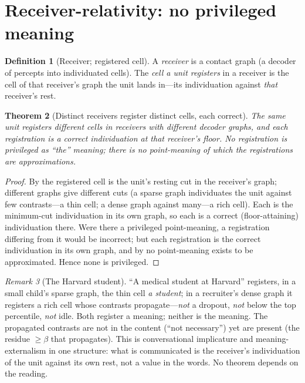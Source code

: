 \documentclass[twocolumn,11pt,a4paper]{article}
\theoremstyle{sup}
\newtheorem{theorem}{Theorem}[section]
\theoremstyle{definition}
\newtheorem{definition}[theorem]{Definition}
\theoremstyle{remark}
\newtheorem{remark}[theorem]{Remark}
\newcommand{\flo}{\beta}
\begin{document}
\section{Receiver-relativity: no privileged meaning}
\label{sec:receiver}

\begin{definition}[Receiver; registered cell]
\label{def:receiver}
A \emph{receiver} is a contact graph (a decoder of percepts into individuated
cells). The \emph{cell a unit registers} in a receiver is the cell of that
receiver's graph the unit lands in---its individuation against \emph{that}
receiver's rest.
\end{definition}

\begin{theorem}[Distinct receivers register distinct cells, each correct]
\label{thm:receiver}
The same unit registers different cells in receivers with different decoder
graphs, and each registration is a correct individuation at that receiver's
floor. No registration is privileged as ``the'' meaning; there is no
point-meaning of which the registrations are approximations.
\end{theorem}

\begin{proof}
By  the registered cell is the unit's resting cut in the
receiver's graph; different graphs give different cuts (a sparse graph
individuates the unit against few contrasts---a thin cell; a dense graph against
many---a rich cell). Each is the minimum-cut individuation in its own graph, so
each is a correct (floor-attaining) individuation there. Were there a privileged
point-meaning, a registration differing from it would be incorrect; but each
registration is the correct individuation in its own graph, and by
 no point-meaning exists to be approximated. Hence none
is privileged.
\end{proof}

\begin{remark}[The Harvard student]
\label{rem:harvard}
``A medical student at Harvard'' registers, in a small child's sparse graph, the
thin cell \emph{a student}; in a recruiter's dense graph it registers a rich
cell whose contrasts propagate---\emph{not} a dropout, \emph{not} below the top
percentile, \emph{not} idle. Both register a meaning; neither is the meaning. The
propagated contrasts are not in the content (``not necessary'') yet are present
(the residue $\ge\flo$ that propagates). This is conversational implicature
\citep{grice1975,sperberwilson1986} and meaning-externalism \citep{putnam1975}
in one structure: what is communicated is the receiver's individuation of the
unit against its own rest, not a value in the words. No theorem depends on the
reading.
\end{remark}
\end{document}
